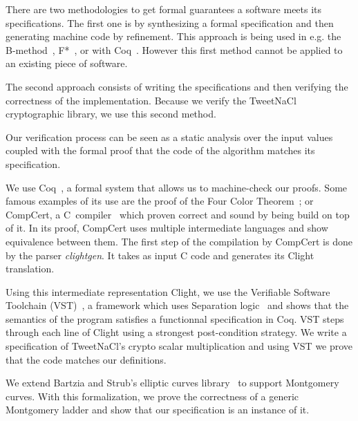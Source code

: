 There are two methodologies to get formal guarantees a software meets its
specifications.
The first one is by synthesizing a formal specification and then generating machine
code by refinement.
This approach is being used in e.g. the B-method~\cite{Abrial:1996:BAP:236705},
F*~\cite{DBLP:journals/corr/BhargavanDFHPRR17}, or with Coq~\cite{CpdtJFR}.
However this first method cannot be applied to an existing piece of software.

The second approach consists of writing the specifications and then verifying
the correctness of the implementation.
Because we verify the TweetNaCl cryptographic library, we use this second method.


Our verification process can be seen as a static analysis over the input values
coupled with the formal proof that the code of the algorithm matches its specification.

We use Coq~\cite{coq-faq}, a formal system that allows us to machine-check our proofs.
Some famous examples of its use are the proof of the Four Color Theorem~\cite{gonthier2008formal}; or
CompCert, a C~compiler~\cite{Leroy-backend} which proven correct and sound by being build on top of it.
In its proof, CompCert uses multiple intermediate languages and show equivalence between them.
The first step of the compilation by CompCert is done by the parser \textit{clightgen}.
It takes as input C code and generates its Clight~\cite{Blazy-Leroy-Clight-09} translation.

Using this intermediate representation Clight, we use the Verifiable Software Toolchain
(VST)~\cite{2012-Appel}, a framework which uses Separation logic~\cite{1969-Hoare,Reynolds02separationlogic}
and shows that the semantics of the program satisfies a functionnal specification in Coq.
VST steps through each line of Clight using a strongest post-condition strategy.
We write a specification of TweetNaCl's crypto scalar multiplication and using
VST we prove that the code matches our definitions.

We extend Bartzia and Strub's elliptic curves library~\cite{DBLP:conf/itp/BartziaS14}
to support Montgomery curves. With this formalization, we prove the correctness
of a generic Montgomery ladder and show that our specification is an instance of it.


